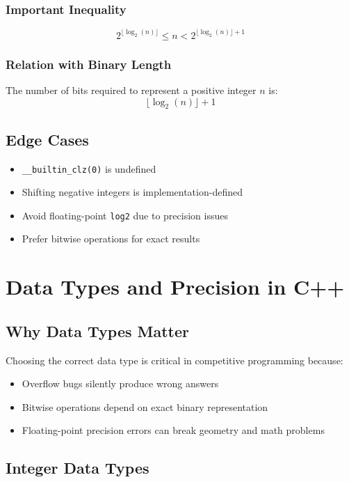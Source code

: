\documentclass[11pt]{article}
\begin{document}
\subsubsection{Important Inequality}
\[
2^{\lfloor \log_2(n) \rfloor} \le n < 2^{\lfloor \log_2(n) \rfloor + 1}
\]

\subsubsection{Relation with Binary Length}
The number of bits required to represent a positive integer $n$ is:
\[
\lfloor \log_2(n) \rfloor + 1
\]

\subsection{Edge Cases}
\begin{itemize}
    \item \texttt{\_\_builtin\_clz(0)} is undefined
    \item Shifting negative integers is implementation-defined
    \item Avoid floating-point \texttt{log2} due to precision issues
    \item Prefer bitwise operations for exact results
\end{itemize}


\section{Data Types and Precision in C++}

\subsection{Why Data Types Matter}
Choosing the correct data type is critical in competitive programming because:
\begin{itemize}
    \item Overflow bugs silently produce wrong answers
    \item Bitwise operations depend on exact binary representation
    \item Floating-point precision errors can break geometry and math problems
\end{itemize}

\subsection{Integer Data Types}
\end{document}
